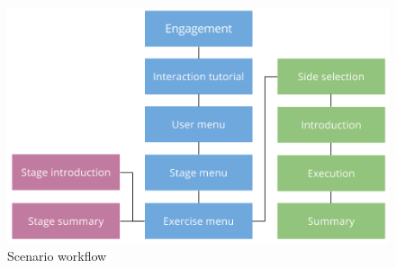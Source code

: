 \begin{figure}[htb]
	\centering
	\begin{minipage}[t]{1\linewidth}
		\centering
		\includegraphics[width=1\linewidth]{Pictures/conceptScenarioFlow2}
		\caption{Scenario workflow}
		\label{fig:scenarioWorkflow}
	\end{minipage}
\end{figure}